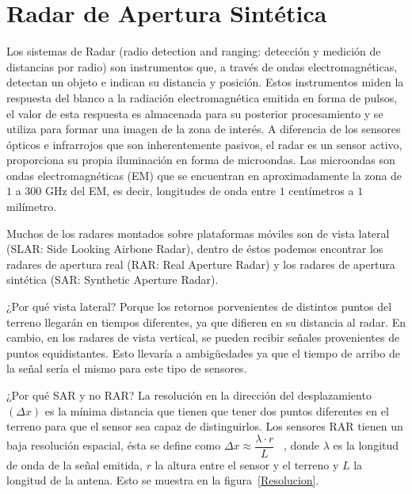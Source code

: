 
\chapter{Radar de Apertura Sintética}
\label{Radar}

Los sistemas de Radar (radio detection and ranging: detección y medición de distancias por radio) son instrumentos que, a través de ondas electromagnéticas, detectan un objeto e indican su distancia y posición. 
Estos instrumentos miden la respuesta del blanco a la radiación electromagnética emitida en forma de pulsos, el valor de esta respuesta es almacenada para su posterior procesamiento y se utiliza para formar una imagen de la zona de interés. A diferencia de los sensores ópticos e infrarrojos que son inherentemente pasivos, el radar es un sensor activo, proporciona su propia iluminación en forma de microondas. Las microondas son ondas electromagnéticas (EM) que se encuentran en aproximadamente la zona de $1$ a $300$ GHz del EM, es decir, longitudes de onda entre $1$ centímetros a $1$ milímetro.

Muchos de los radares montados sobre plataformas móviles son de vista lateral (SLAR: Side Looking Airbone Radar), dentro de éstos podemos encontrar los radares de apertura real (RAR: Real Aperture Radar) y los radares de
apertura sintética (SAR: Synthetic Aperture Radar). 

¿Por qué vista lateral? Porque los retornos porvenientes de distintos puntos del terreno llegarán en tiempos diferentes, ya que difieren en su distancia al radar. En cambio, en los radares de vista vertical, se pueden recibir señales provenientes de puntos equidistantes. Esto llevaría a ambigüedades ya que el tiempo de arribo de la señal sería el mismo para este tipo de sensores.

¿Por qué SAR y no RAR? La resolución en la dirección del desplazamiento $(\Delta x)$ es la mínima distancia que tienen que tener dos puntos diferentes en el terreno para que el sensor sea capaz de distinguirlos. Los sensores RAR tienen un baja resolución espacial, ésta se define como  $\Delta x\approx\dfrac{\lambda \cdot r}{L}$ ~\cite{Sarmap2009}, donde $\lambda$ es la longitud de onda  de la señal emitida, $r$ la altura entre el sensor y el terreno y $L$ la longitud de la antena. Esto se muestra en la figura~\ref{Resolucion}.

